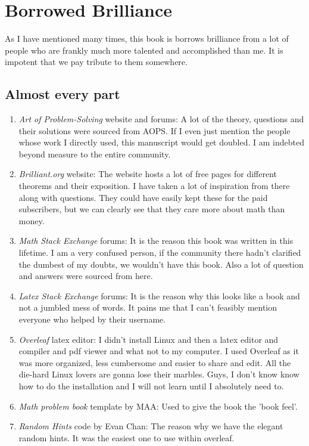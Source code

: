 \chapter{Borrowed Brilliance}
\label{app: borrow}

As I have mentioned many times, this book is  borrows brilliance from a lot of people who are frankly much more talented and accomplished than me. It is impotent that we pay tribute to them somewhere.
\section{Almost every part}
\begin{enumerate}
    \item \emph{Art of Problem-Solving} website and forums: A lot of the theory, questions and their solutions were sourced from AOPS. If I even just mention the people whose work I directly used, this manuscript would get doubled. I am indebted beyond measure to the entire community.
    \item \emph{Brilliant.org} website: The website hosts a lot of free pages for different theorems and their exposition. I have taken a lot of inspiration from there along with questions. They could have easily kept these for the paid subscribers, but we can clearly see that they care more about math than money.
    \item \emph{Math Stack Exchange} forums: It is the reason this book was written in this lifetime. I am a very confused person, if the community there hadn't clarified the dumbest of my doubts, we wouldn't have this book. Also a lot of question and answers were sourced from here.
    \item \emph{Latex Stack Exchange} forums: It is the reason why this looks like a book and not a jumbled mess of words. It pains me that I can't feasibly mention everyone who helped by their username.
    \item \emph{Overleaf} latex editor: I didn't install Linux and then a latex editor and compiler and pdf viewer and what not to my computer. I used Overleaf as it was more organized, less cumbersome and easier to share and edit. All the die-hard Linux lovers are gonna lose their marbles. Guys, I don't know know how to do the installation and I will not learn until I absolutely need to.
    \item \emph{Math problem book} template by MAA: Used to give the book the 'book feel'.
    \item \emph{Random Hints} code by Evan Chan: The reason why we have the elegant random hints. It was the easiest one to use within overleaf.
\end{enumerate}
